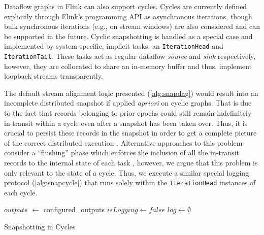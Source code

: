 Dataflow graphs in Flink can also support cycles. Cycles are currently defined explicitly through Flink's programming API as asynchronous iterations, though bulk synchronous iterations (e.g., on stream windows) are also considered and can be supported in the future. Cyclic snapshotting is handled as a special case and implemented by system-specific, implicit tasks: an \texttt{IterationHead} and \texttt{IterationTail}. These tasks act as regular dataflow \emph{source} and \emph{sink} respectively, however, they are collocated to share an in-memory buffer and thus, implement loopback streams transparently.

The default stream alignment logic presented (\autoref{alg:snapdag}) would result into an incomplete distributed snapshot if applied \emph{apriori} on cyclic graphs. That is due to the fact that records belonging to prior epochs could still remain indefinitely in-transit within a cycle even after a snapshot has been taken over. Thus, it is crucial to persist these records in the snapshot in order to get a complete picture of the correct distributed execution \cite{chandy1985distributed,elnozahy2002survey}. Alternative approaches to this problem consider a ``flushing'' phase which enforces the inclusion of all the in-transit records to the internal state of each task \cite{jacques2016consistent}, however, we argue that this problem is only relevant to the state of a cycle. Thus, we execute a similar special logging protocol (\ref{alg:snapcycle}) that runs solely within the \texttt{IterationHead} instances of each cycle.

\begin{algorithm}[t]
$outputs$ $\leftarrow$ configured\_outputs\;
$isLogging \leftarrow false$ \;
$log \leftarrow \emptyset$ \;

\caption{Snapshotting in Cycles}
\label{alg:snapcycle}
\end{algorithm}



